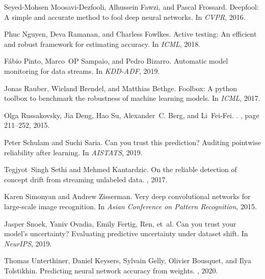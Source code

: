 \documentclass{article}
\begin{document}
\begin{thebibliography}{}
Seyed-Mohsen Moosavi-Dezfooli, Alhussein Fawzi, and Pascal Frossard.
\newblock Deepfool: A simple and accurate method to fool deep neural networks.
\newblock In {\em CVPR}, 2016.

Phuc Nguyen, Deva Ramanan, and Charless Fowlkes.
\newblock Active testing: An efficient and robust framework for estimating
  accuracy.
\newblock In {\em ICML}, 2018.

F{\'a}bio Pinto, Marco~OP Sampaio, and Pedro Bizarro.
\newblock Automatic model monitoring for data streams.
\newblock In {\em KDD-ADF}, 2019.

Jonas Rauber, Wieland Brendel, and Matthias Bethge.
\newblock Foolbox: A python toolbox to benchmark the robustness of machine
  learning models.
\newblock In {\em ICML}, 2017.

Olga Russakovsky, Jia Deng, Hao Su, Alexander~C. Berg, and Li~Fei-Fei.
.
, page 211–252, 2015.

Peter Schulam and Suchi Saria.
\newblock Can you trust this prediction? {Auditing} pointwise reliability after
  learning.
\newblock In {\em AISTATS}, 2019.

Tegjyot~Singh Sethi and Mehmed Kantardzic.
\newblock On the reliable detection of concept drift from streaming unlabeled
  data.
, 2017.

Karen Simonyan and Andrew Zisserman.
\newblock Very deep convolutional networks for large-scale image recognition.
\newblock In {\em Asian Conference on Pattern Recognition}, 2015.

Jasper Snoek, Yaniv Ovadia, Emily Fertig, Ren, et~al.
\newblock Can you trust your model's uncertainty? {Evaluating} predictive
  uncertainty under dataset shift.
\newblock In {\em NeurIPS}, 2019.

Thomas Unterthiner, Daniel Keysers, Sylvain Gelly, Olivier Bousquet, and Ilya
  Tolstikhin.
\newblock Predicting neural network accuracy from weights.
, 2020.

\end{thebibliography}
 
\end{document}
